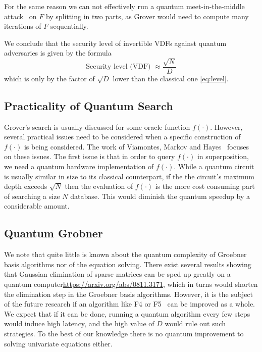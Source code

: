 For the same reason we can not effectively run a quantum meet-in-the-middle attack~\cite{DBLP:journals/sigact/BrassardHT97} on $F$ by splitting in two parts, as Grover would need to compute many iterations of $F$ sequentially.

We conclude that the security level of invertible VDFs against quantum adversaries is given by the formula
 \begin{equation}\label{eq:level2}
     \text{Security level (VDF) }\approx {\frac{\sqrt{N}}{D}} \end{equation}
which is only by the factor of $\sqrt{D}$ lower than the classical one \eqref{eq:level}.


\subsection{Practicality of Quantum Search}

Grover's search is usually discussed for some oracle function $f(\cdot)$. However, several practical issues need to be considered when a specific construction of $f(\cdot)$ is being considered. The work of Viamontes, Markov and Hayes~\cite{practicalityGrover05} focuses on these issues.  The first issue is that in order to query $f(\cdot)$ in superposition, we need a quantum hardware implementation of  $f(\cdot)$. While a quantum circuit is usually similar in size to its classical counterpart, if the the circuit's maximum depth exceeds $\sqrt{N}$ then the evaluation of  $f(\cdot)$ is the more cost consuming part of searching a size $N$ database. This would diminish the quantum speedup by a considerable amount.


\subsection{Quantum Grobner}

We note that quite little is known about the quantum complexity of Groebner basis algorithms nor of the equation solving. There exist several results showing that Gaussian elimination of sparse matrices can be sped up greatly on a quantum computer\url{https://arxiv.org/abs/0811.3171}, which in turns would shorten the elimination step in the Groebner basis algorithms. However, it is the subject of the future research if an algorithm like F4 or F5~\cite{faugere2002new} can be improved as a whole. We expect that if it can be done, running a quantum algorithm every few steps would induce high latency, and the high value of $D$ would rule out such strategies. To the best of our knowledge there is no quantum improvement to solving univariate equations either.
 

